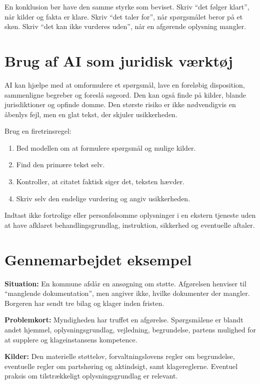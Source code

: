 En konklusion bør have den samme styrke som beviset. Skriv ``det følger klart'', når kilder og fakta er klare. Skriv ``det taler for'', når spørgsmålet beror på et skøn. Skriv ``det kan ikke vurderes uden'', når en afgørende oplysning mangler.

\section{Brug af AI som juridisk værktøj}

AI kan hjælpe med at omformulere et spørgsmål, lave en foreløbig disposition, sammenligne begreber og foreslå søgeord. Den kan også finde på kilder, blande jurisdiktioner og opfinde domme. Den største risiko er ikke nødvendigvis en åbenlys fejl, men en glat tekst, der skjuler usikkerheden.

Brug en firetrinsregel:
\begin{enumerate}
  \item Bed modellen om at formulere spørgsmål og mulige kilder.
  \item Find den primære tekst selv.
  \item Kontroller, at citatet faktisk siger det, teksten hævder.
  \item Skriv selv den endelige vurdering og angiv usikkerheden.
\end{enumerate}

Indtast ikke fortrolige eller personfølsomme oplysninger i en ekstern tjeneste uden at have afklaret behandlingsgrundlag, instruktion, sikkerhed og eventuelle aftaler.

\section{Gennemarbejdet eksempel}

\textbf{Situation:} En kommune afslår en ansøgning om støtte. Afgørelsen henviser til ``manglende dokumentation'', men angiver ikke, hvilke dokumenter der mangler. Borgeren har sendt tre bilag og klager inden fristen.

\textbf{Problemkort:} Myndigheden har truffet en afgørelse. Spørgsmålene er blandt andet hjemmel, oplysningsgrundlag, vejledning, begrundelse, partens mulighed for at supplere og klageinstansens kompetence.

\textbf{Kilder:} Den materielle støttelov, forvaltningslovens regler om begrundelse, eventuelle regler om partshøring og aktindsigt, samt klagereglerne. Eventuel praksis om tilstrækkeligt oplysningsgrundlag er relevant.

